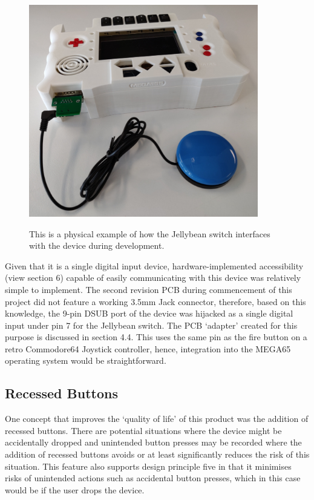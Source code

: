 \begin{figure} [h]
    \centering
    \includegraphics[width=10cm,height=10cm,keepaspectratio]{Figures/jellybean.jpg}
    \caption{This is a physical example of how the Jellybean switch interfaces with the device during development.}
    \label{fig:Jellybean}
\end{figure}

Given that it is a single digital input device, hardware-implemented accessibility (view section 6) capable of easily communicating with this device was relatively simple to implement. 
The second revision PCB during commencement of this project did not feature a working 3.5mm Jack connector, therefore, based on this knowledge, the 9-pin DSUB port of the device was hijacked as a single digital input under pin 7 for the Jellybean switch. 
The PCB ‘adapter’ created for this purpose is discussed in section 4.4.
This uses the same pin as the fire button on a retro Commodore64 Joystick controller, hence, integration into the MEGA65 operating system would be straightforward.

\subsection{Recessed Buttons}

One concept that improves the ‘quality of life’ of this product was the addition of recessed buttons.
There are potential situations where the device might be accidentally dropped and unintended button presses may be recorded where the addition of recessed buttons avoids or at least significantly reduces the risk of this situation.
This feature also supports design principle five in that it minimises risks of unintended actions such as accidental button presses, which in this case would be if the user drops the device.


